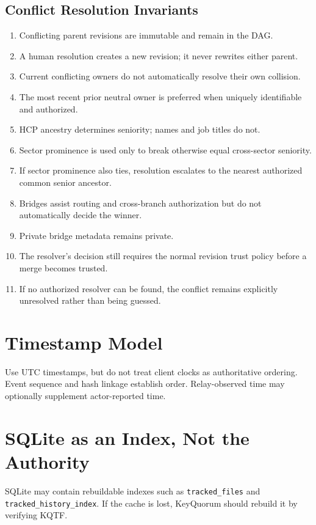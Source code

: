 \documentclass[11pt]{article}
\begin{document}
\subsection{Conflict Resolution Invariants}

\begin{enumerate}[leftmargin=1.8em]
  \item Conflicting parent revisions are immutable and remain in the DAG.
  \item A human resolution creates a new revision; it never rewrites either parent.
  \item Current conflicting owners do not automatically resolve their own collision.
  \item The most recent prior neutral owner is preferred when uniquely identifiable and authorized.
  \item HCP ancestry determines seniority; names and job titles do not.
  \item Sector prominence is used only to break otherwise equal cross-sector seniority.
  \item If sector prominence also ties, resolution escalates to the nearest authorized common senior ancestor.
  \item Bridges assist routing and cross-branch authorization but do not automatically decide the winner.
  \item Private bridge metadata remains private.
  \item The resolver's decision still requires the normal revision trust policy before a merge becomes trusted.
  \item If no authorized resolver can be found, the conflict remains explicitly unresolved rather than being guessed.
\end{enumerate}


\section{Timestamp Model}
Use UTC timestamps, but do not treat client clocks as authoritative ordering. Event sequence and hash linkage establish order. Relay-observed time may optionally supplement actor-reported time.

\section{SQLite as an Index, Not the Authority}
SQLite may contain rebuildable indexes such as \texttt{tracked\_files} and \texttt{tracked\_history\_index}. If the cache is lost, KeyQuorum should rebuild it by verifying KQTF.
\end{document}
